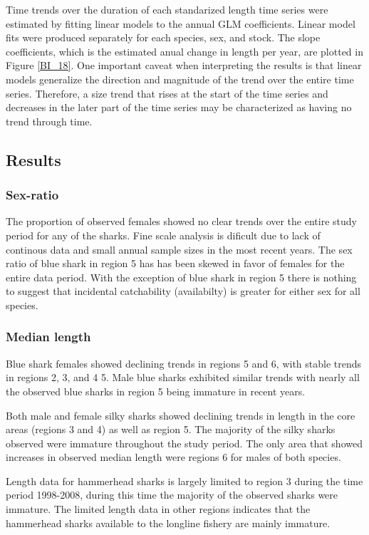 \documentclass[12pt]{SCreport}
\begin{document}
Time trends over the duration of each standarized length time series were estimated by fitting linear models to the annual GLM coefficients.  Linear model fits were produced separately for each species, sex, and stock.   The slope coefficients, which is the estimated anual change in length per year, are plotted in Figure \ref{BI_18}.  One important caveat when interpreting the results is that linear models generalize the direction and magnitude of the trend over the entire time series. Therefore, a size trend that rises at the start of the time series and decreases in the later part of the time series may be characterized as having no trend through time.

\subsection{Results}
\subsubsection{Sex-ratio}
    The proportion of observed females showed no clear trends over the entire study period for any of the sharks.  Fine scale analysis is dificult due to lack of continous data and small annual sample sizes in the most recent years.   The sex ratio of blue shark in region 5 has has been skewed in favor of females for the entire data period. With the exception of blue shark in region 5 there is nothing to suggest that incidental catchability (availabilty) is greater for either sex for all species.
    
\subsubsection{Median length}
Blue shark females showed declining trends in regions 5 and 6, with stable trends in regions 2, 3, and 4 5. Male blue sharks exhibited similar trends with nearly all the observed blue sharks in region 5 being immature in recent years. 

Both male and female silky sharks showed declining trends in length in the core areas (regions 3 and 4) as well as region 5.  The majority of the silky sharks observed were immature throughout the study period. The only area  that showed increases in observed median length were regions 6 for males of both species. 

Length data for hammerhead sharks is largely limited to region 3 during the time period 1998-2008, during this time the majority of the observed sharks were immature. The limited length data in other regions indicates that the hammerhead sharks available to the longline fishery are mainly immature.
\end{document}

